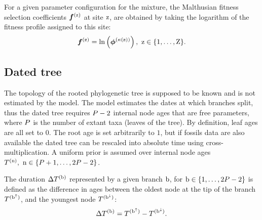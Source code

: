 \documentclass{article}
\begin{document}
    For a given parameter configuration for the mixture, the Malthusian fitness selection coefficients $\bm{f}^{(\text{z})}$ at site $\text{z}$, are obtained by taking the logarithm of the fitness profile assigned to this site:
    \begin{equation}
        \label{eq:sitefitness}
        \bm{f}^{(\text{z})} = \ln \left( \bm{\phi}^{\left( \kappa\left(\text{z}\right) \right)} \right),\ \text{z} \in \{1, \hdots, \text{Z}\}.
    \end{equation}

    \subsection{Dated tree}
    The topology of the rooted phylogenetic tree is supposed to be known and is not estimated by the model.
    The model estimates the dates at which branches split, thus the dated tree requires $P - 2$ internal node ages that are free parameters, where $P$ is the number of extant taxa (leaves of the tree).
    By definition, leaf ages are all set to $0$.
    The root age is set arbitrarily to $1$, but if fossils data are also available the dated tree can be rescaled into absolute time using cross-multiplication.
    A uniform prior is assumed over internal node ages $T^{(\text{n})},\ \text{n} \in \{P + 1, \hdots, 2 P - 2\}$.

    The duration $\Delta T^{(\text{b})}$ represented by a given branch $\text{b}$, for $\text{b} \in \{1, \hdots, 2 P - 2\}$ is defined as the difference in ages between the oldest node at the tip of the branch $T^{(\text{b}^{\uparrow})}$, and the youngest node $T^{(\text{b}^{\downarrow})}$:
    \begin{equation}
        \label{eq:ageTobranchtime}
        \Delta T^{(\text{b})} = T^{(\text{b}^{\uparrow})} - T^{(\text{b}^{\downarrow})}.
    \end{equation}
\end{document}
